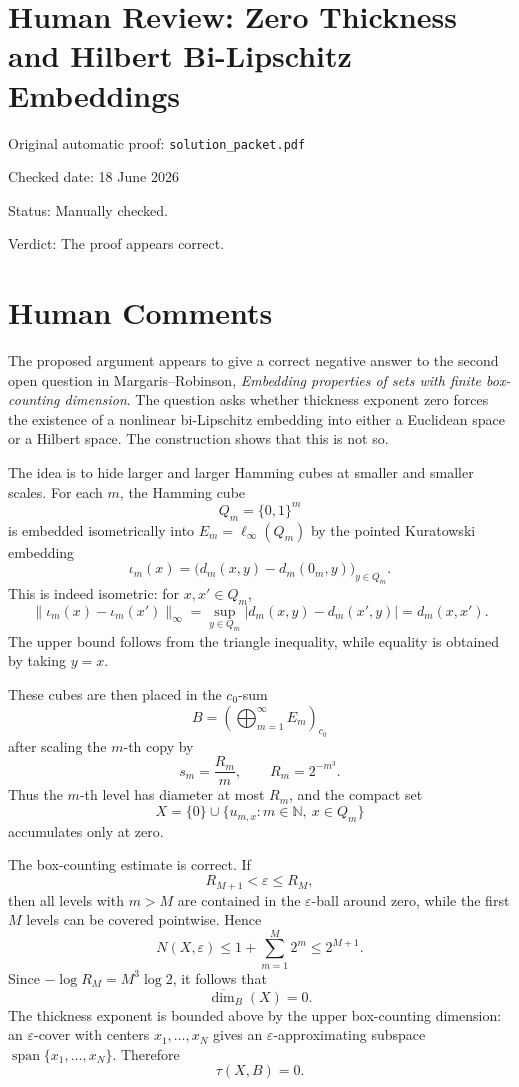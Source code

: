﻿\documentclass[11pt]{article}
\begin{document}
\section*{Human Review: Zero Thickness and Hilbert Bi-Lipschitz Embeddings}

\noindent Original automatic proof: \texttt{solution\_packet.pdf}

\noindent Checked date: 18 June 2026

\noindent Status: Manually checked.

\noindent Verdict: The proof appears correct.

\section*{Human Comments}

The proposed argument appears to give a correct negative answer to the second
open question in Margaris--Robinson, \emph{Embedding properties of sets with
finite box-counting dimension}.  The question asks whether thickness exponent
zero forces the existence of a nonlinear bi-Lipschitz embedding into either a
Euclidean space or a Hilbert space.  The construction shows that this is not
so.

The idea is to hide larger and larger Hamming cubes at smaller and smaller
scales.  For each \(m\), the Hamming cube
\[
  Q_m=\{0,1\}^m
\]
is embedded isometrically into \(E_m=\ell_\infty(Q_m)\) by the pointed
Kuratowski embedding
\[
  \iota_m(x)=\bigl(d_m(x,y)-d_m(0_m,y)\bigr)_{y\in Q_m}.
\]
This is indeed isometric: for \(x,x'\in Q_m\),
\[
  \|\iota_m(x)-\iota_m(x')\|_\infty
  =
  \sup_{y\in Q_m}|d_m(x,y)-d_m(x',y)|
  =d_m(x,x').
\]
The upper bound follows from the triangle inequality, while equality is
obtained by taking \(y=x\).

These cubes are then placed in the \(c_0\)-sum
\[
  B=\left(\bigoplus_{m=1}^\infty E_m\right)_{c_0}
\]
after scaling the \(m\)-th copy by
\[
  s_m=\frac{R_m}{m},\qquad R_m=2^{-m^3}.
\]
Thus the \(m\)-th level has diameter at most \(R_m\), and the compact set
\[
  X=\{0\}\cup\{u_{m,x}:m\in\mathbb N,\ x\in Q_m\}
\]
accumulates only at zero.

The box-counting estimate is correct.  If
\[
  R_{M+1}<\varepsilon\leq R_M,
\]
then all levels with \(m>M\) are contained in the \(\varepsilon\)-ball around
zero, while the first \(M\) levels can be covered pointwise.  Hence
\[
  N(X,\varepsilon)
  \leq
  1+\sum_{m=1}^M 2^m
  \leq
  2^{M+1}.
\]
Since \(-\log R_M=M^3\log 2\), it follows that
\[
  \overline{\dim}_B(X)=0.
\]
The thickness exponent is bounded above by the upper box-counting dimension:
an \(\varepsilon\)-cover with centers \(x_1,\ldots,x_N\) gives an
\(\varepsilon\)-approximating subspace
\(\operatorname{span}\{x_1,\ldots,x_N\}\).  Therefore
\[
  \tau(X,B)=0.
\]
\end{document}
